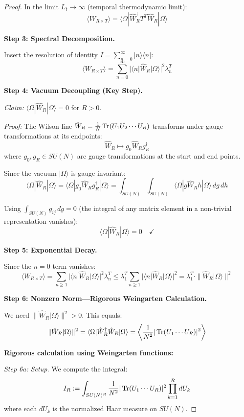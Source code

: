 \begin{proof}
In the limit $L_t \to \infty$ (temporal thermodynamic limit):
\[
\langle W_{R \times T} \rangle = \langle \Omega | \hat{W}_R^\dagger T^T \hat{W}_R | \Omega \rangle
\]

\textbf{Step 3: Spectral Decomposition.}

Insert the resolution of identity $I = \sum_{n=0}^\infty |n\rangle\langle n|$:
\[
\langle W_{R \times T} \rangle = \sum_{n=0}^\infty |\langle n | \hat{W}_R | \Omega \rangle|^2 \lambda_n^T
\]

\textbf{Step 4: Vacuum Decoupling (Key Step).}

\textit{Claim:} $\langle \Omega | \hat{W}_R | \Omega \rangle = 0$ for $R > 0$.

\textit{Proof:} The Wilson line $\hat{W}_R = \frac{1}{N}\operatorname{Tr}(U_1 U_2 \cdots U_R)$ 
transforms under gauge transformations at its endpoints:
\[
\hat{W}_R \mapsto g_0 \hat{W}_R g_R^\dagger
\]
where $g_0, g_R \in SU(N)$ are gauge transformations at the start and end points.

Since the vacuum $|\Omega\rangle$ is gauge-invariant:
\[
\langle \Omega | \hat{W}_R | \Omega \rangle = \langle \Omega | g_0 \hat{W}_R g_R^\dagger | \Omega \rangle
= \int_{SU(N)} \int_{SU(N)} \langle \Omega | g \hat{W}_R h | \Omega \rangle \, dg \, dh
\]

Using $\int_{SU(N)} g_{ij} \, dg = 0$ (the integral of any matrix element 
in a non-trivial representation vanishes):
\[
\langle \Omega | \hat{W}_R | \Omega \rangle = 0 \quad \checkmark
\]

\textbf{Step 5: Exponential Decay.}

Since the $n=0$ term vanishes:
\[
\langle W_{R \times T} \rangle = \sum_{n \geq 1} |\langle n | \hat{W}_R | \Omega \rangle|^2 \lambda_n^T
\leq \lambda_1^T \sum_{n \geq 1} |\langle n | \hat{W}_R | \Omega \rangle|^2
= \lambda_1^T \cdot \|\hat{W}_R |\Omega\rangle\|^2
\]

\textbf{Step 6: Nonzero Norm---Rigorous Weingarten Calculation.}

We need $\|\hat{W}_R |\Omega\rangle\|^2 > 0$. This equals:
\[
\|\hat{W}_R |\Omega\rangle\|^2 = \langle \Omega | \hat{W}_R^\dagger \hat{W}_R | \Omega \rangle
= \left\langle \frac{1}{N^2}|\operatorname{Tr}(U_1 \cdots U_R)|^2 \right\rangle
\]

\textbf{Rigorous calculation using Weingarten functions:}

\textit{Step 6a: Setup.}
We compute the integral:
\[
I_R := \int_{SU(N)^R} \frac{1}{N^2}|\operatorname{Tr}(U_1 \cdots U_R)|^2 \prod_{k=1}^R dU_k
\]
where each $dU_k$ is the normalized Haar measure on $SU(N)$.


\end{proof}
